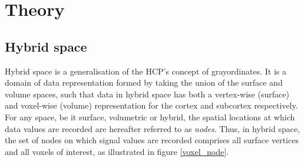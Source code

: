 \documentclass[review]{elsarticle}
\begin{document}

\section{Theory}

\subsection{Hybrid space}

Hybrid space is a generalisation of the HCP's concept of grayordinates. It is a domain of data representation formed by taking the union of the surface and volume spaces, such that data in hybrid space has both a vertex-wise (surface) and voxel-wise (volume) representation for the cortex and subcortex respectively. For any space, be it surface, volumetric or hybrid, the spatial locations at which data values are recorded are hereafter referred to as \textit{nodes}. Thus, in hybrid space, the set of nodes on which signal values are recorded comprises all surface vertices and all voxels of interest, as illustrated in figure \ref{voxel_node}. 
\end{document}
